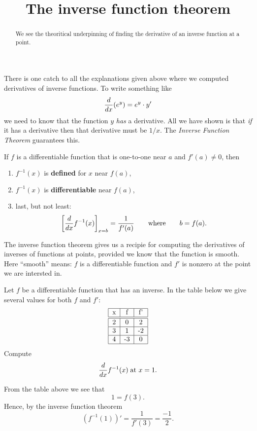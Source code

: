 \documentclass{ximera}
\title[Dig-In:]{The inverse function theorem}
\begin{document}
\begin{abstract}
  We see the theoritical underpinning of finding the derivative of an
  inverse function at a point.
\end{abstract}
\maketitle

There is one catch to all the explanations given above where we
computed derivatives of inverse functions. To write something like
\[
\frac{d}{dx}(e^y)=e^y\cdot y'
\]
we need to know that the function $y$ \textit{has} a derivative. All
we have shown is that \textit{if} it has a derivative then that
derivative must be $1/x$. The \textit{Inverse Function Theorem}
guarantees this.

\begin{theorem}\label{theorem:IFT}
If $f$ is a differentiable function that is one-to-one near $a$ and
$f'(a) \neq 0$, then
\begin{enumerate}
\item $f^{-1}(x)$ is \textbf{defined} for $x$ near $f(a)$,
\item $f^{-1}(x)$ is \textbf{differentiable} near $f(a)$, 
\item last, but not least:
  \[
  \bigg[ \frac{d}{dx} f^{-1}(x) \bigg]_{x=b}  = \frac{1}{f'(a)}\qquad\text{where}\qquad b = f(a).
  \]
\end{enumerate}
\end{theorem}

The inverse function theorem gives us a recipie for computing the
derivatives of inverses of functions at points, provided we know that
the function is smooth. Here ``smooth'' means: $f$ is a differentiable
function and $f'$ is nonzero at the point we are intersted in.

\begin{example}
  Let $f$ be a differentiable function that has an inverse. In the
  table below we give several values for both $f$ and $f'$:
  \[
  \begin{tabular}{|c|c|c|}\hline
    x & f  & f' \\ \hline \hline
    2 & 0  & 2  \\ \hline
    3 & 1  & -2 \\ \hline
    4 & -3 & 0  \\ \hline
  \end{tabular}
  \]
  Compute
  \[
  \frac{d}{dx} f^{-1}(x)\;\text{at $x=1$.}
  \]
  \begin{explanation}
    From the table above we see that
    \[
    1 = f(3).
    \]
    Hence, by the inverse function theorem
    \[
    \left(f^{-1}(1)\right)' = \frac{1}{f'(3)} = \frac{-1}{2}.
    \]
  \end{explanation}
\end{example}
\end{document}
